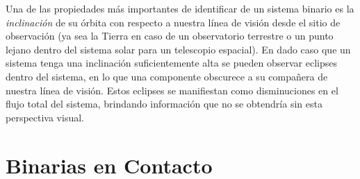 Una de las propiedades más importantes de identificar de un sistema binario es
la \textit{inclinación} de su órbita con respecto a nuestra línea de visión
desde el sitio de observación (ya sea la Tierra en caso de un observatorio
terrestre o un punto lejano dentro del sistema solar para un telescopio
espacial). En dado caso que un sistema tenga una inclinación suficientemente
alta se pueden observar eclipses dentro del sistema, en lo que una componente
obscurece a su compañera de nuestra línea de visión. Estos eclipses se
manifiestan como disminuciones en el flujo total del sistema, brindando
información que no se obtendría sin esta perspectiva visual. 

\section{Binarias en Contacto}